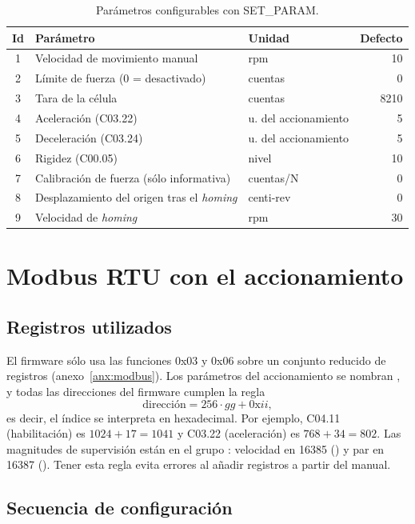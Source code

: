 \begin{table}[H]
\centering
\caption{Parámetros configurables con SET\_PARAM.}
\label{tab:parametros}
\begin{tabular}{@{}cllr@{}}
\toprule
Id & Parámetro & Unidad & Defecto \\
\midrule
1 & Velocidad de movimiento manual & rpm & 10 \\
2 & Límite de fuerza (0 = desactivado) & cuentas & 0 \\
3 & Tara de la célula & cuentas & 8210 \\
4 & Aceleración (C03.22) & u. del accionamiento & 5 \\
5 & Deceleración (C03.24) & u. del accionamiento & 5 \\
6 & Rigidez (C00.05) & nivel & 10 \\
7 & Calibración de fuerza (sólo informativa) & cuentas/N & 0 \\
8 & Desplazamiento del origen tras el \emph{homing} & centi-rev & 0 \\
9 & Velocidad de \emph{homing} & rpm & 30 \\
\bottomrule
\end{tabular}
\end{table}

\section{Modbus RTU con el accionamiento}

\subsection{Registros utilizados}

El firmware sólo usa las funciones 0x03 y 0x06 sobre un conjunto reducido de registros
(anexo~\ref{anx:modbus}). Los parámetros del accionamiento se nombran , y todas las
direcciones del firmware cumplen la regla
\begin{equation}
  \text{dirección} = 256\cdot gg + \text{0x}ii,
\end{equation}
es decir, el índice se interpreta en hexadecimal. Por ejemplo, C04.11 (habilitación) es
$1024 + 17 = 1041$ y C03.22 (aceleración) es $768 + 34 = 802$. Las magnitudes de supervisión
están en el grupo : velocidad en 16385 () y par en 16387
(). Tener esta regla evita errores al añadir registros a partir del manual.

\subsection{Secuencia de configuración}

